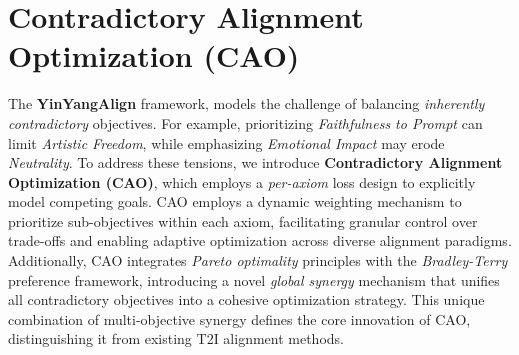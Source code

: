 



\section{Contradictory Alignment Optimization (CAO)}

The \textbf{YinYangAlign} framework, models the challenge of balancing \emph{inherently contradictory} objectives. For example, prioritizing \emph{Faithfulness to Prompt} can limit \emph{Artistic Freedom}, while emphasizing \emph{Emotional Impact} may erode \emph{Neutrality}. To address these tensions, we introduce \textbf{Contradictory Alignment Optimization (CAO)}, which employs a \emph{per-axiom} loss design to explicitly model competing goals. CAO employs a dynamic weighting mechanism to prioritize sub-objectives within each axiom, facilitating granular control over trade-offs and enabling adaptive optimization across diverse alignment paradigms. Additionally, CAO integrates \emph{Pareto optimality} principles with the \emph{Bradley-Terry} preference framework, introducing a novel \emph{global synergy} mechanism that unifies all contradictory objectives into a cohesive optimization strategy. This unique combination of multi-objective synergy defines the core innovation of CAO, distinguishing it from existing T2I alignment methods.




